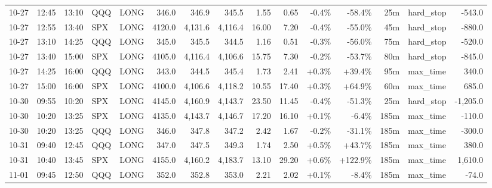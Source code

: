 \documentclass[11pt,a4paper,twoside]{article}
\begin{document}
\begin{landscape}
\begin{center}
\begin{longtable}{>{\color{txtmain}}l l l l l r r r r r r r r >{\color{txtmain}}l r}
10-27 & 12:45 & 13:10 & QQQ & LONG & 346.0 & 346.9 & 345.5 & 1.55 & 0.65 & \textcolor{lossred}{-0.4\%} & \textcolor{lossred}{-58.4\%} & 25m & hard\_stop & \textcolor{lossred}{-543.0} \\
10-27 & 12:55 & 13:40 & SPX & LONG & 4120.0 & 4,131.6 & 4,116.4 & 16.00 & 7.20 & \textcolor{lossred}{-0.4\%} & \textcolor{lossred}{-55.0\%} & 45m & hard\_stop & \textcolor{lossred}{-880.0} \\
10-27 & 13:10 & 14:25 & QQQ & LONG & 345.0 & 345.5 & 344.5 & 1.16 & 0.51 & \textcolor{lossred}{-0.3\%} & \textcolor{lossred}{-56.0\%} & 75m & hard\_stop & \textcolor{lossred}{-520.0} \\
10-27 & 13:40 & 15:00 & SPX & LONG & 4105.0 & 4,116.4 & 4,106.6 & 15.75 & 7.30 & \textcolor{lossred}{-0.2\%} & \textcolor{lossred}{-53.7\%} & 80m & hard\_stop & \textcolor{lossred}{-845.0} \\
10-27 & 14:25 & 16:00 & QQQ & LONG & 343.0 & 344.5 & 345.4 & 1.73 & 2.41 & \textcolor{wingreen}{+0.3\%} & \textcolor{wingreen}{+39.4\%} & 95m & max\_time & \textcolor{wingreen}{340.0} \\
10-27 & 15:00 & 16:00 & SPX & LONG & 4100.0 & 4,106.6 & 4,118.2 & 10.55 & 17.40 & \textcolor{wingreen}{+0.3\%} & \textcolor{wingreen}{+64.9\%} & 60m & max\_time & \textcolor{wingreen}{685.0} \\
10-30 & 09:55 & 10:20 & SPX & LONG & 4145.0 & 4,160.9 & 4,143.7 & 23.50 & 11.45 & \textcolor{lossred}{-0.4\%} & \textcolor{lossred}{-51.3\%} & 25m & hard\_stop & \textcolor{lossred}{-1,205.0} \\
10-30 & 10:20 & 13:25 & SPX & LONG & 4135.0 & 4,143.7 & 4,146.7 & 17.20 & 16.10 & \textcolor{wingreen}{+0.1\%} & \textcolor{lossred}{-6.4\%} & 185m & max\_time & \textcolor{lossred}{-110.0} \\
10-30 & 10:20 & 13:25 & QQQ & LONG & 346.0 & 347.8 & 347.2 & 2.42 & 1.67 & \textcolor{lossred}{-0.2\%} & \textcolor{lossred}{-31.1\%} & 185m & max\_time & \textcolor{lossred}{-300.0} \\
10-31 & 09:40 & 12:45 & QQQ & LONG & 347.0 & 347.5 & 349.3 & 1.74 & 2.50 & \textcolor{wingreen}{+0.5\%} & \textcolor{wingreen}{+43.7\%} & 185m & max\_time & \textcolor{wingreen}{380.0} \\
10-31 & 10:40 & 13:45 & SPX & LONG & 4155.0 & 4,160.2 & 4,183.7 & 13.10 & 29.20 & \textcolor{wingreen}{+0.6\%} & \textcolor{wingreen}{+122.9\%} & 185m & max\_time & \textcolor{wingreen}{1,610.0} \\
11-01 & 09:45 & 12:50 & QQQ & LONG & 352.0 & 352.8 & 353.0 & 2.21 & 2.02 & \textcolor{wingreen}{+0.1\%} & \textcolor{lossred}{-8.4\%} & 185m & max\_time & \textcolor{lossred}{-74.0} \\

\end{longtable}
\end{center}
\end{landscape}
\end{document}
